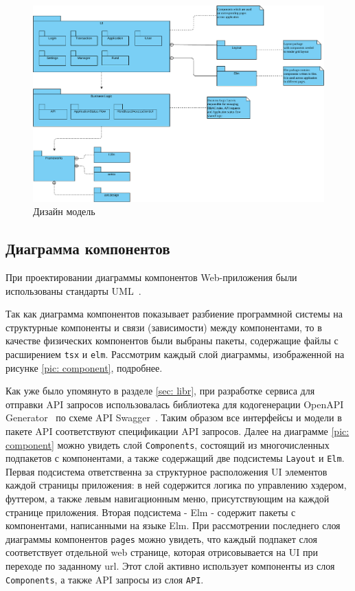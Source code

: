 \documentclass[a4paper,12pt,reqno]{article}
\begin{document}
\begin{figure}[H]
		\centering
		\includegraphics[width = 0.9\linewidth]{img/design model.pdf}
		\caption{Дизайн модель}
		\label{pic: designmodel}
\end{figure}

\subsection{Диаграмма компонентов}

При проектировании диаграммы компонентов Web-приложения были использованы стандарты UML~\cite{uml}. 

Так как диаграмма компонентов показывает разбиение программной системы на структурные компоненты и связи (зависимости) между компонентами, то в качестве физических компонентов были выбраны пакеты, содержащие файлы с расширением \texttt{tsx} и \texttt{elm}. Рассмотрим каждый слой диаграммы, изображенной на рисунке \ref{pic: component}, подробнее.

Как уже было упомянуто в разделе \ref{sec: libr}, при разработке сервиса для отправки API запросов использовалась библиотека для кодогенерации OpenAPI Generator~\cite{openapi} по схеме API Swagger~\cite{api}. Таким образом все интерфейсы и модели в пакете API соответствуют спецификации API запросов. Далее на диаграмме \ref{pic: component} можно увидеть слой \texttt{Components}, состоящий из многочисленных подпакетов с компонентами, а также содержащий две подсистемы \texttt{Layout} и \texttt{Elm}. Первая подсистема ответственна за структурное расположения UI элементов каждой страницы приложения: в ней содержится логика по управлению хэдером, футтером, а также левым навигационным меню, присутствующим на каждой странице приложения. Вторая подсистема - Elm - содержит пакеты с компонентами, написанными на языке Elm. При рассмотрении последнего слоя диаграммы компонентов \texttt{pages} можно увидеть, что каждый подпакет слоя соответствует отдельной web странице, которая отрисовывается на UI при переходе по заданному url. Этот слой активно использует компоненты из слоя \texttt{Components}, а также API запросы из слоя \texttt{API}. 
\end{document}
